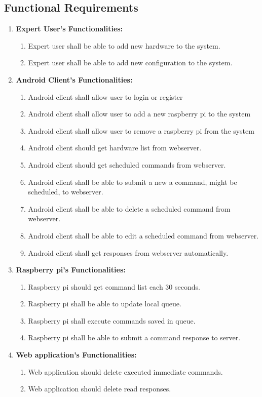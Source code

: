 \documentclass[12pt, oneside, a4paper]{book}
\newcommand\boldcolor[1]{\textcolor{bold}{\textbf{#1}}}
\begin{document}
			\newpage\subsection{Functional Requirements}
			\renewcommand{\labelenumii}{\theenumii}
			\renewcommand{\theenumii}{\theenumi.\arabic{enumii}.}
				\begin{enumerate}[label=3.2.3.\arabic*]
					\item \boldcolor{Expert User's Functionalities:}
					\begin{enumerate}
						\item Expert user shall be able to add new hardware to the system. %
						\item Expert user shall be able to add new configuration to the system. %
					\end{enumerate}
					\item \boldcolor{Android Client's Functionalities:}
					\begin{enumerate}
						\item Android client shall allow user to login or register
						\item Android client shall allow user to add a new raspberry pi to the system
						\item Android client shall allow user to remove a raspberry pi from the system
						\item Android client should get hardware list from webserver. %
						\item Android client should get scheduled commands from webserver. %
						\item Android client shall be able to submit a new a command, might be scheduled, to webserver. %
						\item Android client shall be able to delete a scheduled command from webserver. %
						\item Android client shall be able to edit a scheduled command from webserver. %
						\item Android client shall get responses from webserver automatically. %
					\end{enumerate}
					\item \boldcolor{Raspberry pi's Functionalities:}
					\begin{enumerate}
						\item Raspberry pi should get command list each 30 seconds. %
						\item Raspberry pi shall be able to update local queue. %
						\item Raspberry pi shall execute commands saved in queue. %
						\item Raspberry pi shall be able to submit a command response to server. %
					\end{enumerate}
					\item \boldcolor{Web application's Functionalities:}
					\begin{enumerate}
						\item Web application should delete executed immediate commands. %
						\item Web application should delete read responses. %
					\end{enumerate}
				\end{enumerate}
\end{document}
